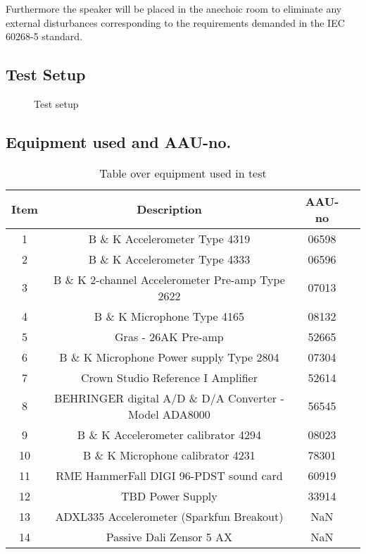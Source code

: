 Furthermore the speaker will be placed in the anechoic room to eliminate any external disturbances corresponding to the requirements demanded in the 
IEC 60268-5 standard.

\subsection*{Test Setup}

\begin{figure}[H]
\centering
{}
\scalebox{0.7}{

}
\caption{Test setup}
\label{figure:SpeakertestSetup2}
\end{figure}

\subsection*{Equipment used and AAU-no.}

\begin{table}[H]
\centering
{}
\begin{tabular}{S[table-format=1]ccc} \toprule
    {Item} & {Description} & {AAU-no} \\       &  B \& K Accelerometer Type 4319  & 06598   \\ 
    2      &  B \& K Accelerometer Type 4333  & 06596   \\ 
    3      &  B \& K 2-channel Accelerometer Pre-amp Type 2622  & 07013   \\
    4      &  B \& K Microphone Type 4165  & 08132   \\
    5      &  Gras - 26AK Pre-amp & 52665   \\
    6      &  B \& K Microphone Power supply Type 2804  & 07304   \\
    7      &  Crown Studio Reference I Amplifier & 52614   \\
    8      &  BEHRINGER digital A/D \& D/A Converter - Model ADA8000   & 56545   \\
    9      &  B \& K Accelerometer calibrator 4294 & 08023   \\
    10     &  B \& K Microphone calibrator 4231 & 78301   \\
    11     &  RME HammerFall DIGI 96-PDST sound card & 60919  \\
    12     &  TBD Power Supply & 33914  \\
    13     &  ADXL335 Accelerometer (Sparkfun Breakout) & NaN  \\
    14     &  Passive Dali Zensor 5 AX & NaN  \\ \bottomrule 
\end{tabular}
\caption{Table over equipment used in test}
\label{tab:UsedEquipment2}
\end{table}



